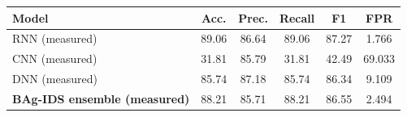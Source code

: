 \begin{tabular}{lccccc}
\toprule
Model & Acc. & Prec. & Recall & F1 & FPR \\
\midrule
RNN (measured) & 89.06 & 86.64 & 89.06 & 87.27 & 1.766 \\
CNN (measured) & 31.81 & 85.79 & 31.81 & 42.49 & 69.033 \\
DNN (measured) & 85.74 & 87.18 & 85.74 & 86.34 & 9.109 \\
\midrule
\textbf{BAg-IDS ensemble (measured)} & 88.21 & 85.71 & 88.21 & 86.55 & 2.494 \\
\bottomrule
\end{tabular}